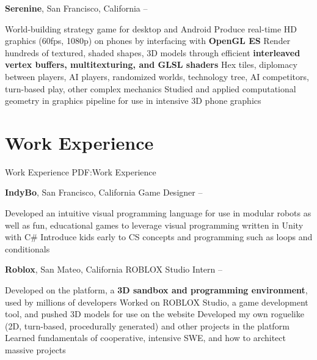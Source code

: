 \documentclass[letterpaper,12pt,oneside]{article}
\begin{document}
\begin{body}
{\textbf{Serenine}}, San Francisco, California
\hfill
{} -- 
\GapNoBreak
\begin{detail}
\SubBulletItem
World-building strategy game for desktop and Android
\SubBulletItem
Produce real-time HD graphics (60fps, 1080p) on phones by interfacing with \textbf{OpenGL ES}
\SubBulletItem
Render hundreds of textured, shaded shapes, 3D models through efficient \newline \textbf{interleaved vertex buffers, multitexturing, and GLSL shaders}
\SubBulletItem
Hex tiles, diplomacy between players, AI players, randomized worlds,
\SubBulletItem
technology tree, AI competitors, turn-based play, other complex mechanics
\SubBulletItem
Studied and applied computational geometry in graphics pipeline for use in intensive 3D phone graphics
\end{detail}


\section
{Work Experience}
{Work Experience}
{PDF:Work Experience}

{\textbf{IndyBo}}, San Francisco, California
\GapNoBreak
\BulletItem
Game Designer
\hfill
{} --
\begin{detail}
\SubBulletItem
Developed an intuitive visual programming language for use in modular robots
\newline
as well as fun, educational games to leverage visual programming written in Unity with C\#
\SubBulletItem
Introduce kids early to CS concepts and programming such as loops and conditionals
\end{detail}


{\textbf{Roblox}}, San Mateo, California
\BulletItem
ROBLOX Studio Intern
\hfill
{} --
\begin{detail}
\SubBulletItem
Developed on the platform, a \textbf{3D sandbox and programming environment}, used by millions of developers
\SubBulletItem
Worked on ROBLOX Studio, a game development tool, and pushed 3D models for use on the website
\SubBulletItem
Developed my own roguelike (2D, turn-based, procedurally generated) and other projects in the platform
\newline 
Learned fundamentals of cooperative, intensive SWE, and how to architect massive projects 
\end{detail}


\end{body}
\end{document}
